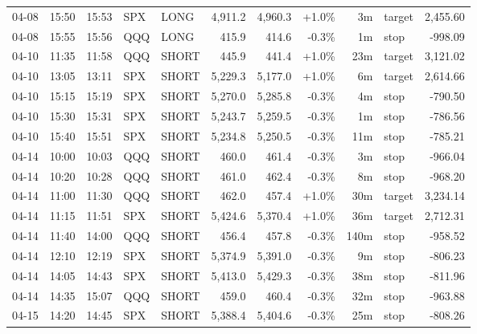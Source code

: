 \documentclass[11pt,a4paper,twoside]{article}
\begin{document}
\begin{center}
\begin{longtable}{>{\color{txtmain}}l l l l l r r r r >{\color{txtmain}}l r}
04-08 & 15:50 & 15:53 & SPX & LONG & 4,911.2 & 4,960.3 & \textcolor{wingreen}{+1.0\%} & 3m & target & \textcolor{wingreen}{2,455.60} \\
04-08 & 15:55 & 15:56 & QQQ & LONG & 415.9 & 414.6 & \textcolor{lossred}{-0.3\%} & 1m & stop & \textcolor{lossred}{-998.09} \\
04-10 & 11:35 & 11:58 & QQQ & SHORT & 445.9 & 441.4 & \textcolor{wingreen}{+1.0\%} & 23m & target & \textcolor{wingreen}{3,121.02} \\
04-10 & 13:05 & 13:11 & SPX & SHORT & 5,229.3 & 5,177.0 & \textcolor{wingreen}{+1.0\%} & 6m & target & \textcolor{wingreen}{2,614.66} \\
04-10 & 15:15 & 15:19 & SPX & SHORT & 5,270.0 & 5,285.8 & \textcolor{lossred}{-0.3\%} & 4m & stop & \textcolor{lossred}{-790.50} \\
04-10 & 15:30 & 15:31 & SPX & SHORT & 5,243.7 & 5,259.5 & \textcolor{lossred}{-0.3\%} & 1m & stop & \textcolor{lossred}{-786.56} \\
04-10 & 15:40 & 15:51 & SPX & SHORT & 5,234.8 & 5,250.5 & \textcolor{lossred}{-0.3\%} & 11m & stop & \textcolor{lossred}{-785.21} \\
04-14 & 10:00 & 10:03 & QQQ & SHORT & 460.0 & 461.4 & \textcolor{lossred}{-0.3\%} & 3m & stop & \textcolor{lossred}{-966.04} \\
04-14 & 10:20 & 10:28 & QQQ & SHORT & 461.0 & 462.4 & \textcolor{lossred}{-0.3\%} & 8m & stop & \textcolor{lossred}{-968.20} \\
04-14 & 11:00 & 11:30 & QQQ & SHORT & 462.0 & 457.4 & \textcolor{wingreen}{+1.0\%} & 30m & target & \textcolor{wingreen}{3,234.14} \\
04-14 & 11:15 & 11:51 & SPX & SHORT & 5,424.6 & 5,370.4 & \textcolor{wingreen}{+1.0\%} & 36m & target & \textcolor{wingreen}{2,712.31} \\
04-14 & 11:40 & 14:00 & QQQ & SHORT & 456.4 & 457.8 & \textcolor{lossred}{-0.3\%} & 140m & stop & \textcolor{lossred}{-958.52} \\
04-14 & 12:10 & 12:19 & SPX & SHORT & 5,374.9 & 5,391.0 & \textcolor{lossred}{-0.3\%} & 9m & stop & \textcolor{lossred}{-806.23} \\
04-14 & 14:05 & 14:43 & SPX & SHORT & 5,413.0 & 5,429.3 & \textcolor{lossred}{-0.3\%} & 38m & stop & \textcolor{lossred}{-811.96} \\
04-14 & 14:35 & 15:07 & QQQ & SHORT & 459.0 & 460.4 & \textcolor{lossred}{-0.3\%} & 32m & stop & \textcolor{lossred}{-963.88} \\
04-15 & 14:20 & 14:45 & SPX & SHORT & 5,388.4 & 5,404.6 & \textcolor{lossred}{-0.3\%} & 25m & stop & \textcolor{lossred}{-808.26} \\

\end{longtable}
\end{center}
\end{document}
